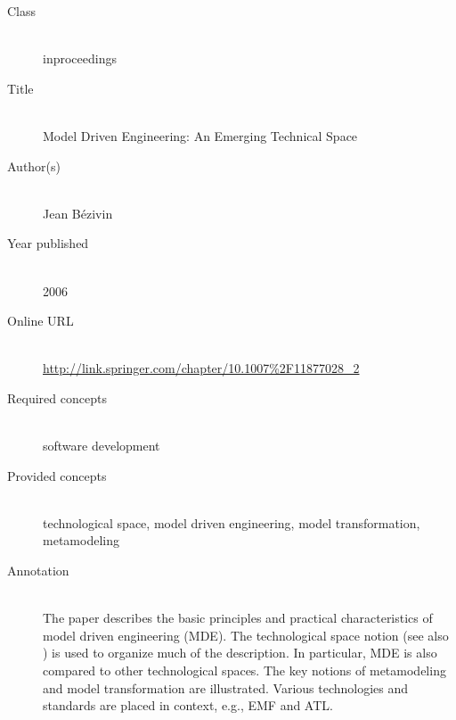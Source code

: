 \begin{description}
\item[Class]\mbox{}\\
inproceedings
\item[Title]\mbox{}\\
Model Driven Engineering: An Emerging Technical Space
\item[Author(s)]\mbox{}\\
Jean B{\'e}zivin\item[Year published]\mbox{}\\
2006
\item[Online URL]\mbox{}\\
{\footnotesize\url{http://link.springer.com/chapter/10.1007%2F11877028_2}}
\item[Required concepts]\mbox{}\\
software development\item[Provided concepts]\mbox{}\\
technological space, model driven engineering, model transformation, metamodeling\item[Annotation]\mbox{}\\
The paper describes the basic principles and practical characteristics of model driven engineering (MDE). The technological space notion (see also ) is used to organize much of the description. In particular, MDE is also compared to other technological spaces. The key notions of metamodeling and model transformation are illustrated. Various technologies and standards are placed in context, e.g., EMF and ATL.
\end{description}


